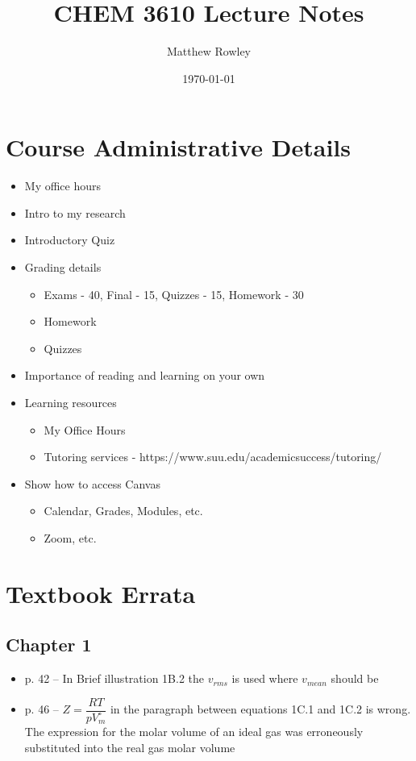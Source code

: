 \documentclass[12pt, openany, letterpaper]{memoir}
\begin{document}
\title{CHEM 3610 Lecture Notes}
\author{Matthew Rowley}
\date{\today}
\mainmatter
\maketitle

\chapter*{Course Administrative Details}
\begin{itemize}
	\item My office hours
	\item Intro to my research
	\item Introductory Quiz
	\item Grading details
	      \begin{itemize}
		      \item Exams - 40, Final - 15, Quizzes - 15, Homework - 30
		      \item Homework
		      \item Quizzes
	      \end{itemize}
	\item Importance of reading and learning on your own
	\item Learning resources
	      \begin{itemize}
		      \item My Office Hours
		      \item Tutoring services - https://www.suu.edu/academicsuccess/tutoring/
	      \end{itemize}
	\item Show how to access Canvas
	      \begin{itemize}
		      \item Calendar, Grades, Modules, etc.
		      \item Zoom, etc.
	      \end{itemize}
\end{itemize}

\chapter*{Textbook Errata}
\section*{Chapter 1}
\begin{itemize}
	\item p. 42 -- In Brief illustration 1B.2 the $v_{rms}$ is used where $v_{mean}$ should be
	\item p. 46 -- $Z = \dfrac{RT}{pV_m^\circ}$ in the paragraph between equations 1C.1 and 1C.2 is wrong. The expression for the molar volume of an ideal gas was erroneously substituted into the real gas molar volume
\end{itemize}
\end{document}
